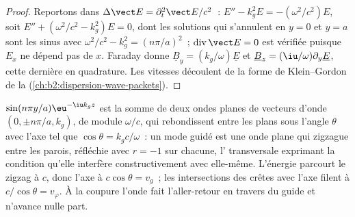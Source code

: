 \begin{proof}
Reportons dans $\Delta\vect E = \partial_t^2\vect E/c^2$~: $E'' - k_g^2E = -(\omega^2/c^2)E$, soit
$E'' + (\omega^2/c^2 - k_g^2)E = 0$, dont les solutions qui s'annulent en $y = 0$ et
$y = a$ sont les sinus avec $\omega^2/c^2 - k_g^2 = (n\pi/a)^2$~; $\operatorname{div}
\vect E = 0$ est vérifiée puisque $E_x$ ne dépend pas de $x$. Faraday donne
$\underline B_y = (k_g/\omega)\underline E$ et $\underline B_z = (\iu/\omega)\partial_y\underline E$, cette dernière
en quadrature. Les vitesses découlent de la forme de Klein--Gordon de
la  (\cref{ch:b2:dispersion-wave-packets}).
\end{proof}

\begin{remark}\label{rem:b2:guided-waves:zigzag}
$\sin(n\pi y/a)\eu^{-\iu k_gz}$ est la somme de deux ondes planes de
vecteurs d'onde $(0, \pm n\pi/a, k_g)$, de module $\omega/c$, qui rebondissent entre
les plans sous l'angle $\theta$ avec l'axe tel que $\cos\theta = k_gc/\omega$~:
un mode guidé est une onde plane qui zigzague entre les parois, réfléchie
avec $r = -1$ sur chacune, l' transversale exprimant la
condition qu'elle interfère constructivement avec elle-même. L'énergie
parcourt le zigzag à $c$, donc l'axe à $c\cos\theta = v_g$~;
les intersections des crêtes avec l'axe filent à $c/\cos\theta = v_\varphi$. À la
coupure l'onde fait l'aller-retour en travers du guide et n'avance
nulle part.
\end{remark}

